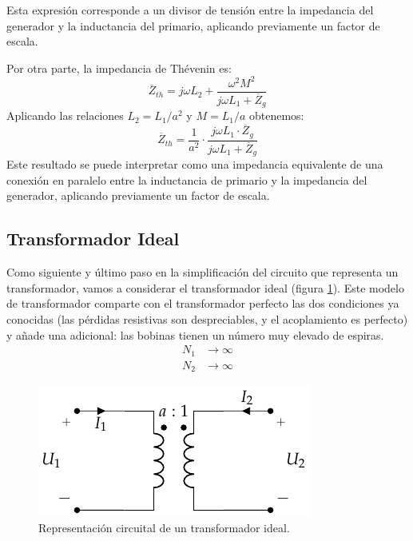 Esta expresión corresponde a un divisor de tensión entre la impedancia
del generador y la inductancia del primario, aplicando previamente un
factor de escala.

Por otra parte, la impedancia de Thévenin es:
\[
  \overline{Z}_{th} = j\omega L_2 + \frac{\omega^2 M^2}{j\omega L_1 +
    \overline{Z}_g}
\]
Aplicando las relaciones $L_2 = L_1/a^2$ y $M = L_1/a$ obtenemos:
\begin{equation}
  \label{eq:trafo-perfecto-impedancia-thevenin}
  \overline{Z}_{th} = \frac{1}{a^2} \cdot \frac{j \omega L_1 \cdot \overline{Z}_g}{j\omega L_1 + \overline{Z}_g}
\end{equation}
Este resultado se puede interpretar como una impedancia equivalente de
una conexión en paralelo entre la inductancia de primario y la
impedancia del generador, aplicando previamente un factor de escala.


\subsection{Transformador Ideal}
\label{sec:trafoIdeal}

Como siguiente y último paso en la simplificación del circuito que
representa un transformador, vamos a considerar el transformador ideal
(figura \ref{fig:trafo-ideal}). Este modelo de transformador comparte
con el transformador perfecto las dos condiciones ya conocidas (las
pérdidas resistivas son despreciables, y el acoplamiento es perfecto)
y añade una adicional: las bobinas tienen un número muy elevado de
espiras.
  \begin{align*}
  N_1 &\to \infty\\
  N_2 &\to \infty
  \end{align*}

  \begin{figure}
    \centering
    \includegraphics[height=0.15\textheight]{../figs/Trafo_Ideal.pdf}
    \caption{Representación circuital de un transformador ideal.}
    \label{fig:trafo-ideal}
  \end{figure}

